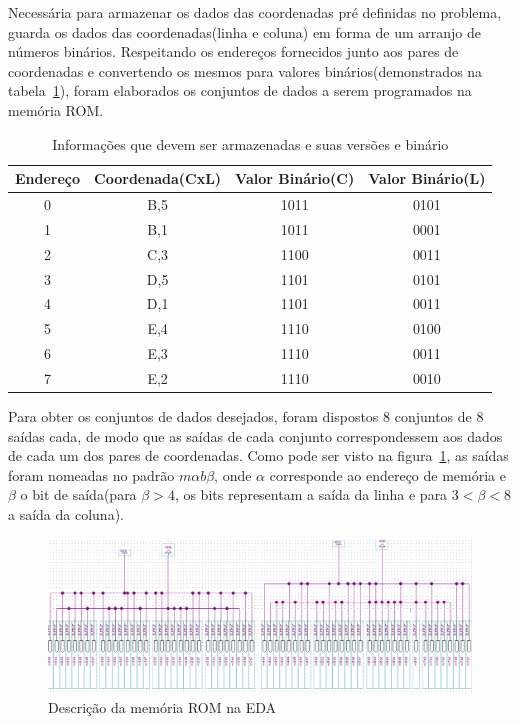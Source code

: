 \documentclass[12pt]{article}
\begin{document}
Necessária para armazenar os dados das coordenadas pré definidas no problema, guarda os dados das coordenadas(linha e coluna) em forma de um arranjo de números binários. Respeitando os endereços fornecidos junto aos pares de coordenadas e convertendo os mesmos para valores binários(demonstrados na tabela~\ref{tab:rom-memory}), foram elaborados os conjuntos de dados a serem programados na memória ROM.

\begin{table}[!htbp]
\centering
\begin{tabular}{||c||c||c||c||}
\hline 
\rule[-1ex]{0pt}{2.5ex} Endereço & Coordenada(CxL) & Valor Binário(C) & Valor Binário(L) \\ 
\hline 
\hline
\rule[-1ex]{0pt}{2.5ex} 0 & B,5 & 1011 & 0101 \\ 
\hline 
\rule[-1ex]{0pt}{2.5ex} 1 & B,1 & 1011 & 0001 \\ 
\hline 
\rule[-1ex]{0pt}{2.5ex} 2 & C,3 & 1100 & 0011 \\ 
\hline 
\rule[-1ex]{0pt}{2.5ex} 3 & D,5 & 1101 & 0101 \\ 
\hline 
\rule[-1ex]{0pt}{2.5ex} 4 & D,1 & 1101 & 0011 \\ 
\hline 
\rule[-1ex]{0pt}{2.5ex} 5 & E,4 & 1110 & 0100 \\ 
\hline 
\rule[-1ex]{0pt}{2.5ex} 6 & E,3 & 1110 & 0011 \\ 
\hline 
\rule[-1ex]{0pt}{2.5ex} 7 & E,2 & 1110 & 0010 \\ 
\hline 
\end{tabular} 
\caption{Informações que devem ser armazenadas e suas versões e binário}
\label{tab:rom-memory}
\end{table}

Para obter os conjuntos de dados desejados, foram dispostos 8 conjuntos de 8 saídas cada, de modo que as saídas de cada conjunto correspondessem aos dados de cada um dos pares de coordenadas. Como pode ser visto na figura~\ref{fig:mem-rom}, as saídas foram nomeadas no padrão $m\alpha b\beta$, onde $\alpha$ corresponde ao endereço de memória e $\beta$ o bit de saída(para $\beta>4$, os bits representam a saída da linha e para $3<\beta<8$ a saída da coluna).

\begin{figure}[!htbp]
\centering
\includegraphics[width=.8\textwidth]{img/rom-memory.png}
\caption{Descrição da memória ROM na EDA}
\label{fig:mem-rom}
\end{figure}
\end{document}

